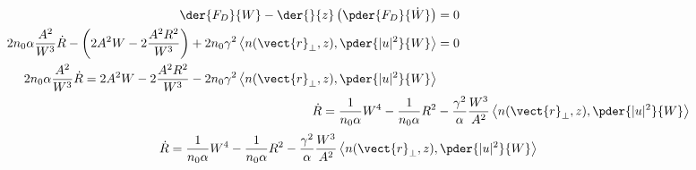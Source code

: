 \begin{equation}
\begin{split}
    \der{F_{D}}{W}  - \der{}{z}\left(\pder{F_{D}}{\dot{W}}\right) &= 0 \\
    2 n_0 \alpha \frac{A^2 }{W^3} \dot{R}   -  \left(2 A^2 W - 2\frac{A^2 R^2}{W^3}\right)+  2n_0 \gamma^2 \left< n(\vect{r}_{\perp},z),\pder{|u|^2}{W}  \right>   &= 0\\
      2 n_0 \alpha \frac{A^2 }{W^3} \dot{R}   =  2 A^2 W - 2\frac{A^2 R^2}{W^3} -  2n_0 \gamma^2 \left< n(\vect{r}_{\perp},z),\pder{|u|^2}{W}  \right> \\
      \dot{R}  = \frac{1}{n_0 \alpha} W^4 - \frac{1}{n_0 \alpha} R^2  &- \frac{ \gamma^2 }{\alpha} \frac{W^3}{A^2 } \left< n(\vect{r}_{\perp},z),\pder{|u|^2}{W}\right>\\
\end{split}
\end{equation}
\begin{equation}
\begin{split}
      \dot{R}  = \frac{1}{n_0 \alpha} W^4 - \frac{1}{n_0 \alpha} R^2  &- \frac{ \gamma^2 }{\alpha} \frac{W^3}{A^2 } \left< n(\vect{r}_{\perp},z),\pder{|u|^2}{W}\right>\\
\end{split}
\end{equation}

